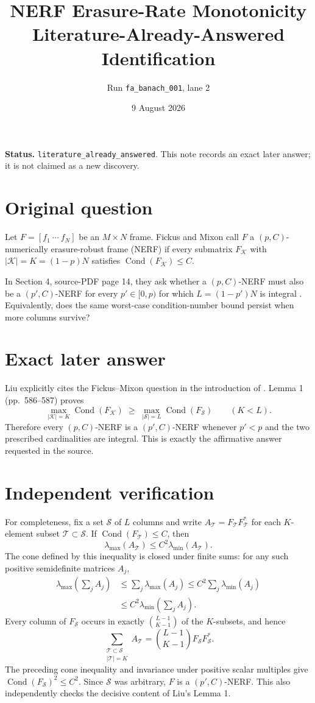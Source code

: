 \documentclass[11pt]{article}
\title{NERF Erasure-Rate Monotonicity\\
\large Literature-Already-Answered Identification}
\author{Run \texttt{fa\_banach\_001}, lane 2}
\date{9 August 2026}
\newcommand{\Cond}{\operatorname{Cond}}
\newcommand{\lmax}{\lambda_{\max}}
\newcommand{\lmin}{\lambda_{\min}}
\begin{document}
\maketitle

\noindent\textbf{Status.}
\texttt{literature\_already\_answered}. This note records an exact later
answer; it is not claimed as a new discovery.

\section{Original question}

Let $F=[f_1\ \cdots\ f_N]$ be an $M\times N$ frame. Fickus and
Mixon call $F$ a $(p,C)$-numerically erasure-robust frame (NERF) if every
submatrix $F_{\mathcal K}$ with
$|\mathcal K|=K=(1-p)N$ satisfies
$\Cond(F_{\mathcal K})\leq C$.

In Section 4, source-PDF page 14, they ask whether a $(p,C)$-NERF must
also be a $(p',C)$-NERF for every $p'\in[0,p)$ for which
$L=(1-p')N$ is integral \cite{fickus-mixon}. Equivalently, does the same
worst-case condition-number bound persist when more columns survive?

\section{Exact later answer}

Liu explicitly cites the Fickus--Mixon question in the introduction of
\cite{liu}. Lemma 1 (pp.~586--587) proves
\[
 \max_{|\mathcal K|=K}\Cond(F_{\mathcal K})
 \;\geq\;
 \max_{|\mathcal S|=L}\Cond(F_{\mathcal S})
 \qquad (K<L).
\]
Therefore every $(p,C)$-NERF is a $(p',C)$-NERF whenever $p'<p$ and the
two prescribed cardinalities are integral. This is exactly the affirmative
answer requested in the source.

\section{Independent verification}

For completeness, fix a set $\mathcal S$ of $L$ columns and write
$A_{\mathcal T}=F_{\mathcal T}F_{\mathcal T}^{*}$ for each
$K$-element subset $\mathcal T\subset\mathcal S$. If
$\Cond(F_{\mathcal T})\leq C$, then
\[
 \lmax(A_{\mathcal T})\leq C^2\lmin(A_{\mathcal T}).
\]
The cone defined by this inequality is closed under finite sums: for any such
positive semidefinite matrices $A_j$,
\begin{align*}
 \lmax\!\left(\sum_j A_j\right)
 &\leq \sum_j\lmax(A_j)
 \leq C^2\sum_j\lmin(A_j)\\
 &\leq C^2\lmin\!\left(\sum_j A_j\right).
\end{align*}
Every column of $F_{\mathcal S}$ occurs in exactly
$\binom{L-1}{K-1}$ of the $K$-subsets, and hence
\[
 \sum_{\substack{\mathcal T\subset\mathcal S\\|\mathcal T|=K}}
 A_{\mathcal T}
 =\binom{L-1}{K-1}F_{\mathcal S}F_{\mathcal S}^{*}.
\]
The preceding cone inequality and invariance under positive scalar multiples
give
$\Cond(F_{\mathcal S})^2\leq C^2$. Since $\mathcal S$ was arbitrary,
$F$ is a $(p',C)$-NERF. This also independently checks the decisive content
of Liu's Lemma 1.
\end{document}
